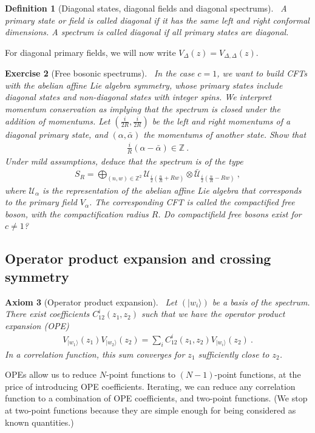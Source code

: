 \documentclass[12pt, a4paper]{article}
\theoremstyle{break}
\newtheorem{exo}{Exercise}[section]
\newtheorem{hyp}[exo]{Axiom}
\newtheorem{defn}[exo]{Definition}
\begin{document}
\begin{defn}[Diagonal states, diagonal fields and diagonal spectrums]
 ~\label{def:diag}
 A primary state or field is called diagonal if it has the same left and right conformal dimensions. A spectrum is called diagonal if all primary states are diagonal.
\end{defn}
For diagonal primary fields, we will now write  $V_\Delta(z) = V_{\Delta,\Delta}(z)$.

\begin{exo}[Free bosonic spectrums]
~\label{exo:fbs}
In the case $c=1$, we want to build CFTs with the abelian affine Lie algebra symmetry, whose primary states include diagonal states and non-diagonal states with integer spins. We interpret momentum conservation as implying that the spectrum is closed under the addition of momentums. Let $(\frac{i}{2R},\frac{i}{2R})$ be the left and right momentums of a diagonal primary state, and $(\alpha,\bar\alpha)$ the momentums of another state. Show that 
\begin{align}
 \frac{i}{R}(\alpha-\bar\alpha)\in\mathbb{Z}\ .
\end{align}
Under mild assumptions, deduce that the spectrum is of the type 
 \begin{align}
 S_R = \bigoplus_{(n,w)\in {\mathbb{Z}^2}} \mathcal{U}_{\frac{i}{2}\left(\frac{n}{R} + Rw\right)} \otimes \bar{\mathcal{U}}_{\frac{i}{2}\left(\frac{n}{R} - Rw\right)} \ ,
\label{sr}
\end{align}
where $\mathcal{U}_\alpha$ is the representation of the abelian affine Lie algebra that corresponds to the primary field $V_\alpha$. The corresponding CFT is called the compactified free boson, with the compactification radius $R$. Do compactifield free bosons exist for $c\neq 1$?
\end{exo}


\subsection{Operator product expansion and crossing symmetry}

\begin{hyp}[Operator product expansion]
 ~\label{hyp:ope}
 Let $(|w_i\rangle)$ be a basis of the spectrum.
 There exist coefficients $C^i_{12}(z_1,z_2)$ such that we have the operator product expansion (OPE) 
 \begin{align}
  V_{|w_1\rangle}(z_1)V_{|w_2\rangle}(z_2) = \sum_i C^i_{12}(z_1,z_2) V_{|w_i\rangle}(z_2)\ .
 \end{align}
 In a correlation function,
 this sum converges for $z_1$ sufficiently close to $z_2$.
\end{hyp}
OPEs allow us to reduce $N$-point functions to $(N-1)$-point functions, at the price of introducing OPE coefficients. 
Iterating, we can reduce any correlation function to a combination of OPE coefficients, and two-point functions. (We stop at two-point functions because they are simple enough for being considered as known quantities.) 
\end{document}
